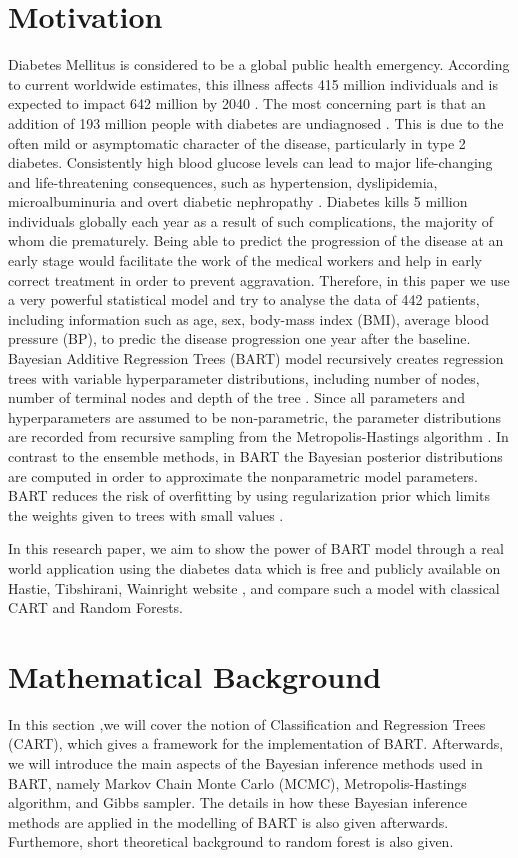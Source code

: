 \documentclass{usiinftr}
\begin{document}
\section{Motivation}
Diabetes Mellitus is considered to be a global public health emergency. According to current worldwide estimates, this illness affects 415 million individuals and is expected to impact 642 million by 2040 \cite{27}. The most concerning part is that an addition of 193 million people with diabetes are undiagnosed \cite{27}. This is due to the often mild or asymptomatic character of the disease, particularly in type 2 diabetes. Consistently high blood glucose levels can lead to major life-changing and life-threatening consequences, such as hypertension, dyslipidemia, microalbuminuria and overt diabetic nephropathy \cite{27}. Diabetes kills 5 million individuals globally each year as a result of such complications, the majority of whom die prematurely. Being able to predict the progression of the disease at an early stage would facilitate the work of the medical workers and help in early correct treatment in order to prevent aggravation.  Therefore, in this paper we use a very powerful statistical model and try to analyse the data of 442 patients, including information such as age, sex, body-mass index (BMI), average blood pressure (BP), to predic the disease progression one year after the baseline. 
Bayesian Additive Regression Trees (BART) model recursively creates regression trees with variable hyperparameter distributions, including number of nodes, number of terminal nodes and depth of the tree \cite{16}. Since all parameters and hyperparameters are assumed to be non-parametric, the parameter distributions are recorded from recursive sampling from the Metropolis-Hastings algorithm \cite{16}. In contrast to the ensemble methods, in BART the Bayesian posterior distributions are computed in order to approximate the nonparametric model parameters. BART reduces the risk of overfitting by using regularization prior which limits the weights given to trees with small values \cite{16}. 

In this research paper, we aim to show the power of BART model through a real world application using the diabetes data which is free and publicly available on Hastie, Tibshirani,
Wainright website \cite{24}, and compare such a model with classical CART and Random Forests.  

\section{Mathematical Background}
In this section ,we will cover the notion of Classification and Regression Trees (CART), which gives a framework for the implementation of BART. 
Afterwards, we will introduce the main aspects of the Bayesian inference methods used in BART, namely Markov Chain Monte Carlo (MCMC), Metropolis-Hastings algorithm, and Gibbs sampler. The details in how these Bayesian inference methods are applied in the modelling of BART is also given afterwards. Furthemore, short theoretical background to random forest is also given.
\end{document}
